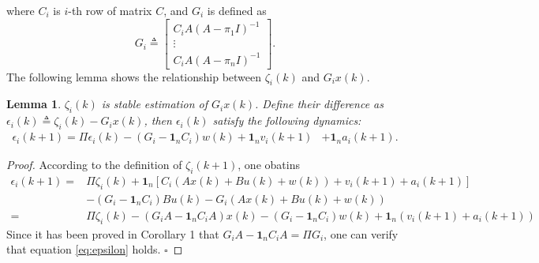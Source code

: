\documentclass[12pt]{article}  %
\newtheorem{proposition}{\textbf{Proposition}}
\newtheorem{lemma}{\textbf{Lemma}}
\newtheorem*{proof}{\textbf{Proof}}
\begin{document}
%
%
where $C_i$ is $i$-th row of matrix $C$, and $G_i$ is defined as
\begin{equation}\label{eq:def_Gi}
	G_{i} \triangleq\left[\begin{array}{c}
		C_{i} A\left(A-\pi_{1} I\right)^{-1} \\
		\vdots \\
		C_{i} A\left(A-\pi_{n} I\right)^{-1}
	\end{array}\right].
\end{equation}
The following lemma shows the relationship between $\zeta_i(k)$ and $G_ix(k)$.
\begin{lemma}\label{lm:epsilon}
	$\zeta_i(k)$ is stable estimation of $G_ix(k)$. Define their difference as $\epsilon_i(k)\triangleq\zeta_{i}(k)-G_ix(k)$, then $\epsilon_i(k)$ satisfy the following dynamics:
	\begin{align}
		\epsilon_{i}(k+1)= \Pi \epsilon_{i}(k)-\left(G_{i}-\mathbf{1}_{n} C_{i}\right) w(k) 
		+\mathbf{1}_{n} v_{i}(k+1)&+\mathbf{1}_{n} a_{i}(k+1) . \label{eq:epsilon}
	\end{align}
\end{lemma}
\begin{proof}
	According to the definition of $\zeta_{i}(k+1)$, one obatins
	\begin{align*}
	\epsilon_{i}(k+1)=&\Pi\zeta_{i}(k)+\mathbf{1}_n\left[C_i\left(Ax(k)+Bu(k)+w(k)\right)+v_i(k+1)+a_i(k+1)\right]\\
	&-\left(G_{i}-\mathbf{1}_{n} C_{i}\right)Bu(k)-G_i\left(Ax(k)+Bu(k)+w(k)\right)\\
	=&\Pi\zeta_{i}(k)-\left(G_iA-\mathbf{1}_nC_iA\right)x(k)- \left(G_{i}-\mathbf{1}_{n} C_{i}\right) w(k) 
	+\mathbf{1}_{n}\left( v_{i}(k+1)+ a_{i}(k+1) \right)
	\end{align*}
	Since it has been proved in \cite{liuxinghua-TAC2020} Corollary 1 that $G_iA-\mathbf{1}_nC_iA=\Pi G_i$, one can verify that equation \eqref{eq:epsilon} holds. $\square$
\end{proof}
\end{document}
